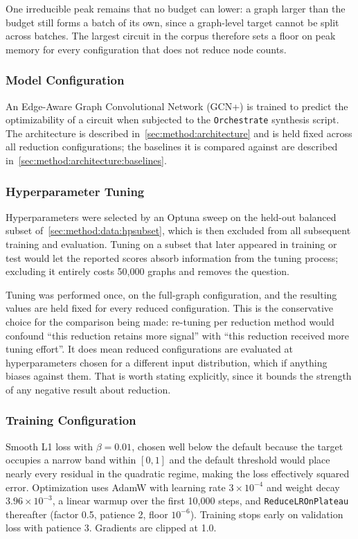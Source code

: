 One irreducible peak remains that no budget can lower: a graph larger than the budget still
forms a batch of its own, since a graph-level target cannot be split across batches. The
largest circuit in the corpus therefore sets a floor on peak memory for every configuration
that does not reduce node counts.

\subsubsection{Model Configuration}
\label{sec:method:experiment:model}
An Edge-Aware Graph Convolutional Network (GCN+) is trained to predict the optimizability of
a circuit when subjected to the \texttt{Orchestrate} synthesis script. The architecture is
described in~\ref{sec:method:architecture} and is held fixed across all reduction
configurations; the baselines it is compared against are described
in~\ref{sec:method:architecture:baselines}.

\subsubsection{Hyperparameter Tuning}
\label{sec:method:experiment:hp}
Hyperparameters were selected by an Optuna \citep{akiba2019optuna} sweep on the held-out
balanced subset of~\ref{sec:method:data:hpsubset}, which is then excluded from all
subsequent training and evaluation. Tuning on a subset that later appeared in training or
test would let the reported scores absorb information from the tuning process; excluding it
entirely costs 50,000 graphs and removes the question.

Tuning was performed once, on the full-graph configuration, and the resulting values are held
fixed for every reduced configuration. This is the conservative choice for the comparison
being made: re-tuning per reduction method would confound ``this reduction retains more
signal'' with ``this reduction received more tuning effort''. It does mean reduced
configurations are evaluated at hyperparameters chosen for a different input distribution,
which if anything biases against them. That is worth stating explicitly, since it bounds the
strength of any negative result about reduction.

\subsubsection{Training Configuration}
\label{sec:method:experiment:training}
Smooth L1 loss with $\beta = 0.01$, chosen well below the default because the target occupies
a narrow band within $[0,1]$ and the default threshold would place nearly every residual in
the quadratic regime, making the loss effectively squared error. Optimization uses AdamW with
learning rate $3 \times 10^{-4}$ and weight decay $3.96 \times 10^{-3}$, a linear warmup over
the first 10,000 steps, and \texttt{ReduceLROnPlateau} thereafter (factor 0.5, patience 2,
floor $10^{-6}$). Training stops early on validation loss with patience 3. Gradients are
clipped at 1.0.

